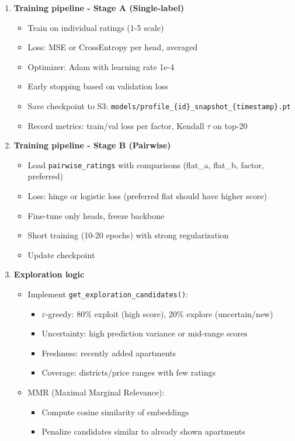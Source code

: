 \documentclass[12pt,a4paper]{article}
\begin{document}
\begin{enumerate}
    \item \textbf{Training pipeline - Stage A (Single-label)}
    \begin{itemize}
        \item Train on individual ratings (1-5 scale)
        \item Loss: MSE or CrossEntropy per head, averaged
        \item Optimizer: Adam with learning rate 1e-4
        \item Early stopping based on validation loss
        \item Save checkpoint to S3: \texttt{models/profile\_\{id\}\_snapshot\_\{timestamp\}.pt}
        \item Record metrics: train/val loss per factor, Kendall $\tau$ on top-20
    \end{itemize}
    
    \item \textbf{Training pipeline - Stage B (Pairwise)}
    \begin{itemize}
        \item Load \texttt{pairwise\_ratings} with comparisons (flat\_a, flat\_b, factor, preferred)
        \item Loss: hinge or logistic loss (preferred flat should have higher score)
        \item Fine-tune only heads, freeze backbone
        \item Short training (10-20 epochs) with strong regularization
        \item Update checkpoint
    \end{itemize}
    
    \item \textbf{Exploration logic}
    \begin{itemize}
        \item Implement \texttt{get\_exploration\_candidates()}:
        \begin{itemize}
            \item $\varepsilon$-greedy: 80\% exploit (high score), 20\% explore (uncertain/new)
            \item Uncertainty: high prediction variance or mid-range scores
            \item Freshness: recently added apartments
            \item Coverage: districts/price ranges with few ratings
        \end{itemize}
        \item MMR (Maximal Marginal Relevance):
        \begin{itemize}
            \item Compute cosine similarity of embeddings
            \item Penalize candidates similar to already shown apartments
        \end{itemize}
    \end{itemize}
    

\end{enumerate}
\end{document}

